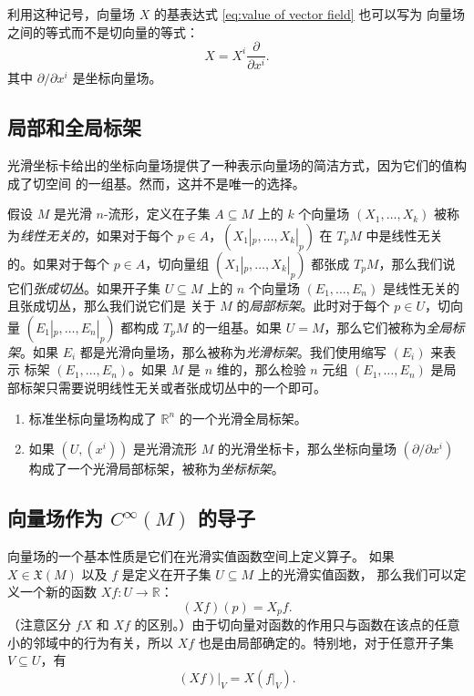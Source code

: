 利用这种记号，向量场 $X$ 的基表达式 \eqref{eq:value of vector field} 也可以写为
向量场之间的等式而不是切向量的等式：
\[
  X=X^i\frac{\partial }{\partial x^i}.
\]
其中 $\partial/\partial x^i$ 是坐标向量场。

\subsection{局部和全局标架}

光滑坐标卡给出的坐标向量场提供了一种表示向量场的简洁方式，因为它们的值构成了切空间
的一组基。然而，这并不是唯一的选择。

假设 $M$ 是光滑 $n$-流形，定义在子集 $A\subseteq M$ 上的 $k$ 个向量场 $(X_1,\dots,X_k)$
被称为\emph{线性无关的}，如果对于每个 $p\in A$，$\left(X_1|_p,\dots,X_k|_p\right)$
在 $T_pM$ 中是线性无关的。如果对于每个 $p\in A$，切向量组 $\left(X_1|_p,\dots,X_k|_p\right)$
都张成 $T_pM$，那么我们说它们\emph{张成切丛}。如果开子集 $U\subseteq M$ 上的
$n$ 个向量场 $(E_1,\dots,E_n)$ 是线性无关的且张成切丛，那么我们说它们是
关于 $M$ 的\emph{局部标架}。此时对于每个 $p\in U$，切向量 $\left(E_1|_p,\dots,E_n|_p\right)$
都构成 $T_pM$ 的一组基。如果 $U=M$，那么它们被称为\emph{全局标架}。如果
$E_i$ 都是光滑向量场，那么被称为\emph{光滑标架}。我们使用缩写 $(E_i)$ 来表示
标架 $(E_1,\dots,E_n)$。如果 $M$ 是 $n$ 维的，那么检验 $n$ 元组
$(E_1,\dots,E_n)$ 是局部标架只需要说明线性无关或者张成切丛中的一个即可。

\begin{example}[局部和全局标架]\mbox{}
  \begin{enumerate}
    \item 标准坐标向量场构成了 $\mathbb{R}^n$ 的一个光滑全局标架。
    \item 如果 $(U,(x^i))$ 是光滑流形 $M$ 的光滑坐标卡，那么坐标向量场
    $\left(\partial/\partial x^i\right)$ 构成了一个光滑局部标架，被称为\emph{坐标标架}。
  \end{enumerate}
\end{example}

\subsection{向量场作为 $C^\infty(M)$ 的导子}

向量场的一个基本性质是它们在光滑实值函数空间上定义算子。
如果 $X\in \mathfrak X(M)$ 以及 $f$ 是定义在开子集 $U\subseteq M$ 上的光滑实值函数，
那么我们可以定义一个新的函数 $Xf:U\to \mathbb{R}$：
\[
  (Xf)(p)=X_pf.
\]
（注意区分 $fX$ 和 $Xf$ 的区别。）由于切向量对函数的作用只与函数在该点的任意小的邻域中的行为有关，所以
$Xf$ 也是由局部确定的。特别地，对于任意开子集 $V\subseteq U$，有
\[
  (Xf)|_V=X(f|_V).
\]

